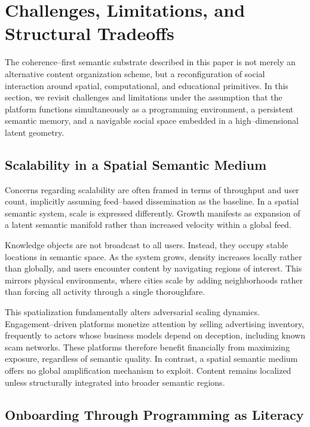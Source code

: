 \documentclass[11pt]{article}
\begin{document}
\section{Challenges, Limitations, and Structural Tradeoffs}

The coherence--first semantic substrate described in this paper is not merely an alternative
content organization scheme, but a reconfiguration of social interaction around spatial,
computational, and educational primitives. In this section, we revisit challenges and
limitations under the assumption that the platform functions simultaneously as a
programming environment, a persistent semantic memory, and a navigable social space
embedded in a high--dimensional latent geometry.

\subsection{Scalability in a Spatial Semantic Medium}

Concerns regarding scalability are often framed in terms of throughput and user count,
implicitly assuming feed--based dissemination as the baseline. In a spatial semantic
system, scale is expressed differently. Growth manifests as expansion of a latent semantic
manifold rather than increased velocity within a global feed.

Knowledge objects are not broadcast to all users. Instead, they occupy stable locations in
semantic space. As the system grows, density increases locally rather than globally, and
users encounter content by navigating regions of interest. This mirrors physical
environments, where cities scale by adding neighborhoods rather than forcing all activity
through a single thoroughfare.

This spatialization fundamentally alters adversarial scaling dynamics. Engagement--driven
platforms monetize attention by selling advertising inventory, frequently to actors whose
business models depend on deception, including known scam networks. These platforms
therefore benefit financially from maximizing exposure, regardless of semantic quality.
In contrast, a spatial semantic medium offers no global amplification mechanism to exploit.
Content remains localized unless structurally integrated into broader semantic regions.

\subsection{Onboarding Through Programming as Literacy}
\end{document}
